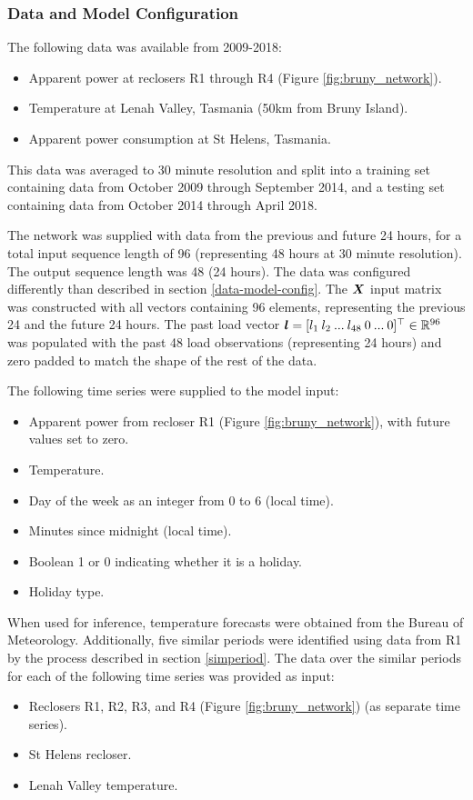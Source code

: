 \subsubsection{Data and  Model Configuration}
The following data was available from 2009-2018:
\begin{itemize}
	\item Apparent power at reclosers R1 through R4 (Figure \ref{fig:bruny_network}).
	\item Temperature at Lenah Valley, Tasmania (50km from Bruny Island). 
	\item Apparent power consumption at St Helens, Tasmania.
\end{itemize}

This data was averaged to 30 minute resolution and split into a training set containing data from October 2009 through September 2014, and a testing set containing data from October 2014 through April 2018.

The network was supplied with data from the previous and future 24 hours, for a total input sequence length of 96 (representing 48 hours at 30 minute resolution).
The output sequence length was 48 (24 hours).
The data was configured differently than described in section \ref{data-model-config}.
The ${\bm{X}}$ input matrix was constructed with all vectors containing 96 elements, representing the previous 24 and the future 24 hours.
The past load vector ${\bm{l}} = [ l_1 \: l_2 \: ...  \: l_{48} \: 0 \: ... \: 0]^\top \in \mathbb{R}^{96}$ was populated with the past 48 load observations (representing 24 hours) and zero padded to match the shape of the rest of the data.

The following time series were supplied to the model input:
\begin{itemize}
	\item Apparent power from recloser R1 (Figure \ref{fig:bruny_network}), with future values set to zero.
	\item Temperature.
	\item Day of the week as an integer from 0 to 6 (local time).
	\item Minutes since midnight (local time).
	\item Boolean 1 or 0 indicating whether it is a holiday.
	\item Holiday type.
\end{itemize}

When used for inference, temperature forecasts were obtained from the Bureau of Meteorology.
Additionally, five similar periods were identified using data from R1 by the process described in section \ref{simperiod}.
The data over the similar periods for each of the following time series was provided as input:
\begin{itemize}
	\item Reclosers R1, R2, R3, and R4 (Figure \ref{fig:bruny_network}) (as separate time series).
	\item St Helens recloser.
	\item Lenah Valley temperature.
\end{itemize}

